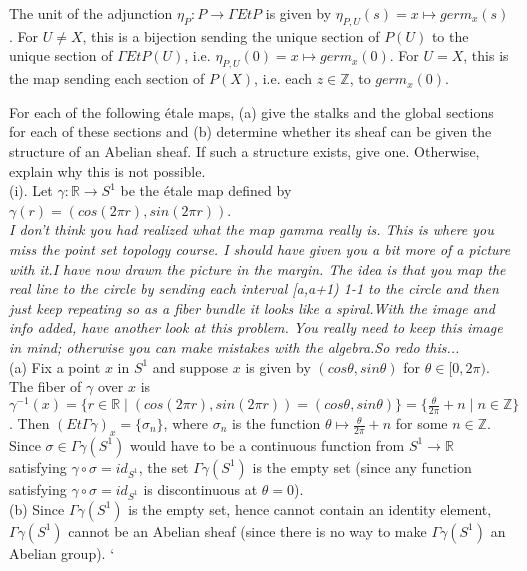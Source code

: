 The unit of the adjunction $\eta_P: P \rightarrow \Gamma EtP$ is given by $\eta_{P,U}(s)= x \mapsto germ_x(s)$. For $U \neq X$, this is a bijection sending the unique section of $P(U)$ to the unique section of $\Gamma EtP(U)$, i.e. $\eta_{P,U}(0)= x \mapsto germ_x(0)$. For $U = X$, this is the map sending each section of $P(X)$, i.e. each $z \in \mathbb{Z}$, to $germ_x(0)$. 

 For each of the following \'etale maps, (a) give the stalks and the global sections for each of these sections and (b) determine whether its sheaf can be given the structure of an Abelian sheaf. If such a structure exists, give one. Otherwise, explain why this is not possible.\\


(i).  Let $\gamma: \mathbb{R} \rightarrow S^1$ be the \'etale map defined by $\gamma(r) = (cos(2\pi r), sin(2\pi r))$.\\

\textit{I don't think you had realized what the map gamma really is. This is where you miss the point set topology course. I should have given you a bit more of a picture with it.I have now drawn the picture in the margin. The idea is that you map the real line  to the circle by  sending each interval [a,a+1) 1-1 to the circle and then just keep repeating so as a fiber bundle it looks like a spiral.With the image and info added, have another look at this problem. You really need to keep this image in mind; otherwise you can make mistakes with the algebra.So redo this...}\\

(a) Fix a point $x$ in $S^1$ and suppose $x$ is given by $(cos\theta, sin\theta)$ for $\theta \in [0,2\pi)$. The fiber of $\gamma$ over $x$ is $\gamma^{-1}(x)=\{r \in \mathbb{R} \mid (cos(2\pi r), sin(2\pi r)) = (cos\theta, sin\theta)\} = \{\frac{\theta}{2\pi} + n \mid n \in \mathbb{Z}\}$. Then $(Et \Gamma \gamma)_x = \{\sigma_n\}$, where $\sigma_n$ is the function $\theta \mapsto \frac{\theta}{2\pi} + n$ for some $n \in \mathbb{Z}$.\\

Since $\sigma \in \Gamma \gamma(S^1)$ would have to be a continuous function from $S^1 \rightarrow \mathbb{R}$ satisfying $\gamma \circ \sigma = id_{S^1}$, the set $\Gamma \gamma (S^1)$ is the empty set (since any function satisfying $\gamma \circ \sigma = id_{S^1}$ is discontinuous at $\theta = 0$).\\

(b) Since $\Gamma \gamma (S^1)$ is the empty set, hence cannot contain an identity element, $\Gamma \gamma (S^1)$ cannot be an Abelian sheaf (since there is no way to make $\Gamma \gamma (S^1)$ an Abelian group).
\newpage`

